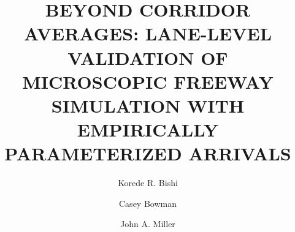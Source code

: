 \documentclass{scspaperproc}
\theoremstyle{scsthe}
\begin{document}




\def\SCSconferencename{Annual Modeling and Simulation Conference}

\def\SCSconferenceacro{ANNSIM'26}

\def\SCSpublicationyear{2026}

\def\SCSconferenceeditors{G. Rabadi, V. Prabhu, R. Cárdenas, A. Bany Abdelnabi, J. Jabbour, and M. Germanos}

\def\SCSconferencedates{May 4-7}

\def\SCSconferencevenue{University of Central Florida, Orlando, Florida, USA}


\title{BEYOND CORRIDOR AVERAGES: LANE-LEVEL VALIDATION OF MICROSCOPIC FREEWAY SIMULATION WITH EMPIRICALLY PARAMETERIZED ARRIVALS
}



\author[\authorrefmark{1}]{Korede R. Bishi}
\author[\authorrefmark{2}]{Casey Bowman}
\author[\authorrefmark{1}]{John A. Miller}


\end{document}

